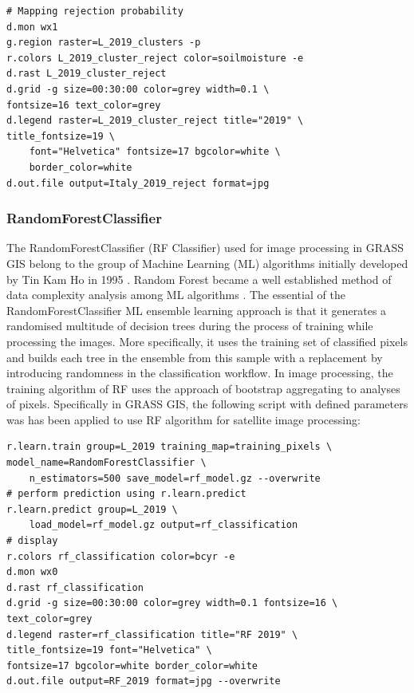 \documentclass[eprint,
approc,		%
]{actapoly}
\begin{document}
\begin{footnotesize}
\begin{verbatim}
# Mapping rejection probability
d.mon wx1
g.region raster=L_2019_clusters -p
r.colors L_2019_cluster_reject color=soilmoisture -e
d.rast L_2019_cluster_reject
d.grid -g size=00:30:00 color=grey width=0.1 \
fontsize=16 text_color=grey
d.legend raster=L_2019_cluster_reject title="2019" \
title_fontsize=19 \
	font="Helvetica" fontsize=17 bgcolor=white \
	border_color=white
d.out.file output=Italy_2019_reject format=jpg
\end{verbatim}
\end{footnotesize}

\subsubsection{RandomForestClassifier}

The RandomForestClassifier (RF Classifier) used for image processing in GRASS GIS belong to the group of Machine Learning (ML) algorithms initially developed by Tin Kam Ho in 1995 \citep{598994}. Random Forest became a well established method of data complexity analysis among ML algorithms \citep{990132}. The essential of the RandomForestClassifier ML ensemble learning approach is that it generates a randomised multitude of decision trees during the process of training while processing the images. More specifically, it uses the training set of classified pixels and builds each tree in the ensemble from this sample with a replacement by introducing randomness in the classification workflow. In image processing, the training algorithm of RF uses the approach of bootstrap aggregating to analyses of pixels. Specifically in GRASS GIS, the following script with defined parameters was has been applied to use RF algorithm for satellite image processing: 

\begin{footnotesize}
\begin{verbatim}
r.learn.train group=L_2019 training_map=training_pixels \
model_name=RandomForestClassifier \
    n_estimators=500 save_model=rf_model.gz --overwrite
# perform prediction using r.learn.predict
r.learn.predict group=L_2019 \
	load_model=rf_model.gz output=rf_classification 
# display
r.colors rf_classification color=bcyr -e
d.mon wx0
d.rast rf_classification
d.grid -g size=00:30:00 color=grey width=0.1 fontsize=16 \
text_color=grey
d.legend raster=rf_classification title="RF 2019" \
title_fontsize=19 font="Helvetica" \
fontsize=17 bgcolor=white border_color=white
d.out.file output=RF_2019 format=jpg --overwrite
\end{verbatim}
\end{footnotesize}
\end{document}
